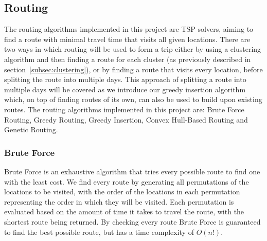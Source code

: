 \noindent
{}

\subsection{Routing}\label{subsec:routing}
The routing algorithms implemented in this project are TSP solvers, aiming to find a route with minimal travel time
that visits all given locations.
There are two ways in which routing will be used to form a trip either by using a clustering algorithm and then
finding a route for each cluster (as previously described in section~\ref{subsec:clustering}), or by finding a route
that visits every location, before splitting the route into multiple days.
This approach of splitting a route into multiple days will be covered as we introduce our greedy insertion
algorithm which, on top of finding routes of its own, can also be used to build upon existing routes.
The routing algorithms implemented in this project are: Brute Force Routing, Greedy Routing, Greedy Insertion, Convex
Hull-Based Routing and Genetic Routing.

\subsubsection{Brute Force}\label{subsubsec:brute-force-routing}
Brute Force is an exhaustive algorithm that tries every possible route to find one with the least cost.
We find every route by generating all permutations of the locations to be visited, with the order of the locations
in each permutation representing the order in which they will be visited.
Each permutation is evaluated based on the amount of time it takes to travel the route, with the shortest route being
returned.
By checking every route Brute Force is guaranteed to find the best possible route, but has a time complexity of $O(n!)$.
\\

